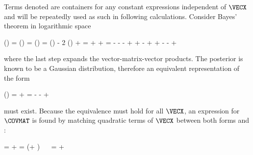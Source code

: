     Terms denoted  are containers for any constant expressions
    independent of $\VECX$ and will be repeatedly used as such in following
    calculations. Consider Bayes' theorem in logarithmic space

    \placesubformula
    \startformula
    \startalign[n=2,align={right,left}]
         \ln(\POSTERIOR) =  \ln\left(\frac{\JOINT}{\NORMALIZATION}\right) \NR
        \NC =  \ln\left(\frac{\LIKELIHOOD \PRIOR}{\NORMALIZATION}\right) \NR
        \NC =  \ln(\LIKELIHOOD) - 2 \ln(\PRIOR) + \CONST \NR
        \NC = \NC \GAUSSEXP{\VECY}{\MATB \VECX - \VECB}{\MATQ}
            + \GAUSSEXP{\VECX}{\VECA}{\MATP} + \CONST\NR
        \NC = \NC
            \VECYT \MATQ \VECY
            - \VECYT \MATQ \MATB \VECX
            - \VECYT \MATQ \VECB
            - \VECXT \MATBT \MATQ \VECY
            \NR
        \NC \NC
            + \VECXT \MATBT \MATQ \MATB \VECX
            + \VECXT \MATBT \MATQ \VECB
            - \VECBT \MATQ \VECY
            + \VECBT \MATQ \MATB \VECX
            \NR[eq:gaussprodexpand]
        \NC \NC
            + \VECXT \MATP \VECX
            - \VECXT \MATP \VECA
            - \VECAT \MATP \VECX
            + \CONST
            \NR
    \stopalign
    \stopformula

    where the last step expands the vector-matrix-vector products. The
    posterior is known to be a Gaussian distribution, therefore an equivalent
    representation of the form

    \placesubformula
    \startformula
    \startalign[n=2,align={right,left}]
         \ln(\POSTERIOR) = \NC
            \GAUSSEXP{\VECX}{\VECC}{\MATS} + \CONST \NR
        \NC = \NC
             \VECXT \MATS \VECX
             - \VECXT \MATS \VECC
             - \VECCT \MATS \VECX
             + \CONST \NR[eq:gausspostexpand]
    \stopalign
    \stopformula

    must exist. Because the equivalence must hold for all $\VECX$, an
    expression for $\COVMAT$ is found by matching quadratic terms of $\VECX$
    between both forms  and :

    \startformula
    \startalign[n=3,align={left,right,left}]
        \NC \NC \VECXT \MATS \VECX = \NC
            \VECXT \MATBT \MATQ \MATB \VECX + \VECXT \MATP \VECX \NR
        \NC \NC = \NC
            \VECXT (\MATBT \MATQ \MATB + \MATP) \VECX \NR
        \NC \Rightarrow~~ \NC \MATS = \NC
            \MATBT \MATQ \MATB + \MATP
            \EQSTOP
    \stopalign
    \stopformula

